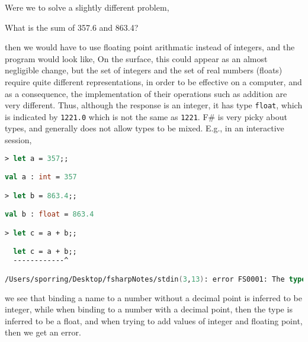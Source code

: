 Were we to solve a slightly different problem,
\begin{problem}
  What is the sum of 357.6 and 863.4?
\end{problem}
then we would have to use floating point arithmatic instead of integers, and the program would look like,
%
%
On the surface, this could appear as an almost negligible change, but the set of integers and the set of real numbers (floats) require quite different representations, in order to be effective on a computer, and as a consequence, the implementation of their operations such as addition are very different. Thus, although the response is an integer, it has type \lstinline|float|, which is indicated by \lstinline|1221.0| which is not the same as \lstinline|1221|. F\# is very picky about types, and generally does not allow types to be mixed. E.g., in an interactive session,
\begin{lstlisting}[language=fsharp,caption=fsharpi]
> let a = 357;;

val a : int = 357

> let b = 863.4;;

val b : float = 863.4

> let c = a + b;;

  let c = a + b;;
  ------------^

/Users/sporring/Desktop/fsharpNotes/stdin(3,13): error FS0001: The type 'float' does not match the type 'int'
\end{lstlisting}
we see that binding a name to a number without a decimal point is inferred to be integer, while when binding to a number with a decimal point, then the type is inferred to be a float, and when trying to add values of integer and floating point, then we get an error.

